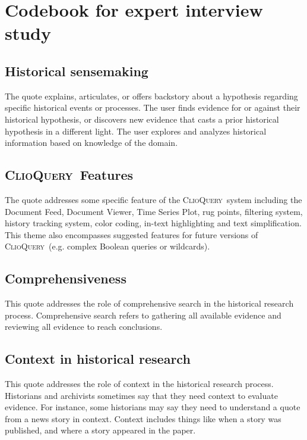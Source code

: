 \documentclass[acmsmall,screen,review,anonymous]{acmart}
\newcommand{\ours}{\textsc{ClioQuery}}
\begin{document}

\section*{Codebook for expert interview study}

\subsection*{Historical sensemaking}
The quote explains, articulates, or offers backstory about a hypothesis regarding specific historical events or processes. The user finds evidence for or against their historical hypothesis, or discovers new evidence that casts a prior historical hypothesis in a different light. The user explores and analyzes historical information based on knowledge of the domain.

\subsection*{\ours~Features}
The quote addresses some specific feature of the \ours~system including the Document Feed, Document Viewer, Time Series Plot, rug points, filtering system, history tracking system, color coding, in-text highlighting and text simplification. This theme also encompasses suggested features for future versions of \ours~(e.g. complex Boolean queries or wildcards).

\subsection*{Comprehensiveness}
This quote addresses the role of comprehensive search in the historical research process. Comprehensive search refers to gathering all available evidence and reviewing all evidence to reach conclusions. 


\subsection*{Context in historical research}
This quote addresses the role of context in the historical research process. Historians and archivists sometimes say that they need context to evaluate evidence. For instance, some historians may say they need to understand a quote from a news story in context. Context includes things like when a story was published, and where a story appeared in the paper.
\end{document}
